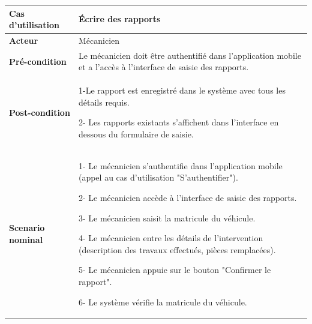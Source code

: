 \begin{table}[H]
    \centering
    \renewcommand{\arraystretch}{1}
    \begin{tabular}{|p{4cm}|p{9cm}|}
        \hline
        \textbf{Cas d'utilisation} & Écrire des rapports                                                                                              \\
        \hline
        \textbf{Acteur}            & Mécanicien                                                                                                       \\
        \hline
        \textbf{Pré-condition}     & Le mécanicien doit être authentifié dans l'application mobile et a l'accès à l'interface de saisie des rapports. \\


        \hline
        \textbf{Post-condition}    & 1-Le rapport est enregistré dans le système avec tous les détails requis.\newline

        2- Les rapports existants s'affichent dans l'interface en dessous du formulaire de saisie.                                                    \\
        \hline
        \textbf{Scenario nominal}  & 1- Le mécanicien s'authentifie dans l'application mobile (appel au cas d'utilisation "S'authentifier").\newline

        2- Le mécanicien accède à l'interface de saisie des rapports.\newline

        3- Le mécanicien saisit la matricule du véhicule.\newline

        4- Le mécanicien entre les détails de l'intervention (description des travaux effectués, pièces remplacées).\newline

        5- Le mécanicien appuie sur le bouton "Confirmer le rapport".\newline

        6- Le système vérifie la matricule du véhicule.                                                                                               \\
    \end{tabular}
\end{table}

\newpage


